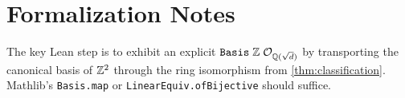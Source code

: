 \section{Formalization Notes}

\begin{remark}
  The key Lean step is to exhibit an explicit
  $\texttt{Basis}\;\mathbb{Z}\;\mathcal{O}_{\mathbb{Q}(\sqrt{d})}$ by transporting the canonical
  basis of $\mathbb{Z}^2$ through the ring isomorphism from
  \cref{thm:classification}.
  Mathlib's \texttt{Basis.map} or \texttt{LinearEquiv.ofBijective}
  should suffice.
\end{remark}
